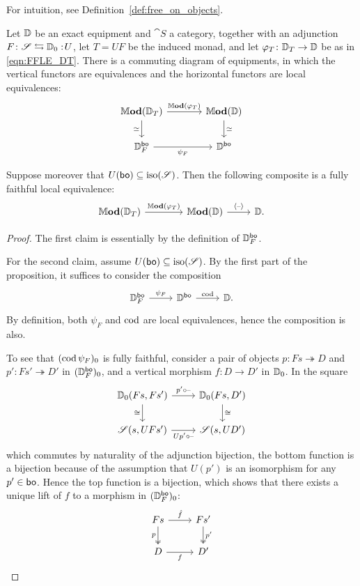 \documentclass[11pt,oneside,article]{memoir}
\begin{document}
For intuition, see Definition~\ref{def:free_on_objects}.

\begin{proposition}
      \label{prop:objectfree_Mod_bo}
   Let $\mathbb{D}$ be an exact equipment and $\cat{S}$ a category, together with an adjunction
   $F\colon\mathscr{S}\leftrightarrows \mathbb{D}_0:\!U$, let $T=UF$ be the induced monad, and let
   $\varphi_T\colon\mathbb{D}_T\to\mathbb{D}$ be as in \eqref{eqn:FFLE_DT}. There is a commuting
   diagram of equipments, in which the vertical functors are equivalences and the horizontal
   functors are local equivalences:
   \[ \begin{tikzcd}[column sep=large]
      \dMod(\dcat{D}_T) \ar[r,"\dMod(\varphi_T)"] \ar[d,"\equiv"']
         & \dMod(\dcat{D}) \ar[d,"\equiv"] \\
      \dcat{D}_F^{\bo} \ar[r,"\psi_F"'] & \dcat{D}^{\bo}
   \end{tikzcd} \]

   Suppose moreover that $U(\mathsf{bo})\subseteq\mathrm{iso}(\mathscr{S})$. Then the following composite is a
   fully faithful local equivalence:
   \[ \begin{tikzcd}
      \dMod(\dcat{D}_T)\ar[r,"\dMod(\varphi_T)"] &[1.5em] \dMod(\dcat{D}) \ar[r,"\ColDash"] & \dcat{D}.
   \end{tikzcd} \]
\end{proposition}
\begin{proof}
   The first claim is essentially by the definition of $\mathbb{D}^{\mathsf{bo}}_F$.

   For the second claim, assume $U(\mathsf{bo})\subseteq\mathrm{iso}(\mathscr{S})$. By
   the first part of the proposition, it suffices to consider the composition
   \[ \begin{tikzcd}
      \dcat{D}^{\bo}_F \ar[r,"\psi_F"] & \dcat{D}^{\bo} \ar[r,"\cod"] & \dcat{D}.
   \end{tikzcd} \]
   By definition, both $\psi_F$ and $\operatorname{cod}$ are local equivalences, hence the composition is also.

   To see that $(\operatorname{cod}\psi_F)_0$ is fully faithful, consider a pair of objects $p\colon
   Fs\twoheadrightarrow D$ and $p'\colon Fs'\twoheadrightarrow D'$ in $(\mathbb{D}_F^{\mathsf{bo}})_0$, and a
   vertical morphism $f\colon D\to D'$ in $\mathbb{D}_0$. In the square
   \[ \begin{tikzcd}
      \dcat{D}_0(Fs,Fs') \ar[r,"p'\circ\textrm{--}"] \ar[d,"\iso"']
         & \dcat{D}_0(Fs,D') \ar[d,"\iso"] \\
      \cat{S}(s,UFs') \ar[r,"Up'\circ\textrm{--}"']
         & \cat{S}(s,UD')
   \end{tikzcd} \]
   which commutes by naturality of the adjunction bijection, the bottom function is a bijection
   because of the assumption that $U(p')$ is an isomorphism for any $p'\in\mathsf{bo}$. Hence the top
   function is a bijection, which shows that there exists a unique lift of $f$ to a morphism in
   $(\mathbb{D}_F^{\mathsf{bo}})_0$:
   \[ \begin{tikzcd}
      Fs \ar[r,"\hat{f}"] \ar[d,two heads,"p"']
         & Fs' \ar[d,two heads,"p'"] \\
      D \ar[r,"f"'] & D'
   \end{tikzcd} \]
\end{proof}
\end{document}
